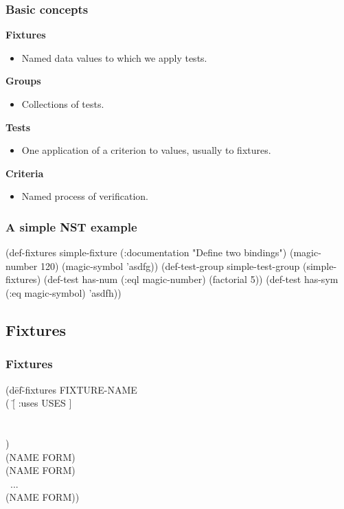 \documentclass{beamer}
\begin{document}
\begin{frame}
  \frametitle{Basic concepts}
\textbf{Fixtures}
\begin{itemize}
\item Named data values to which we apply tests.
\end{itemize}
\textbf{Groups}
\begin{itemize}
\item Collections of tests.
\end{itemize}
\textbf{Tests}
\begin{itemize}
\item One application of a criterion to values, usually to fixtures.
\end{itemize}
\textbf{Criteria}
\begin{itemize}
\item Named process of verification.
\end{itemize}
\end{frame}

\begin{frame}[fragile]
  \frametitle{A simple NST example}
{\small\begin{semiverbatim}
\alert<1>{(def-fixtures simple-fixture}
\alert<1>{    (:documentation "Define two bindings")}
\alert<1>{  (magic-number 120)}
\alert<1>{  (magic-symbol 'asdfg))}
\alert<2>{(def-test-group simple-test-group}
    (\alert<3>{simple-fixtures})
  \alert<7>{(def-test \alert<4>{has-num}}
      \alert<7>{\alert<5>{(:eql \alert<3>{magic-number})}}
    \alert<7>{\alert<6>{(factorial 5)})}
  \alert<8>{(def-test \alert<4>{has-sym}}
      \alert<8>{\alert<5>{(:eq \alert<3>{magic-symbol})}}
    \alert<8>{\alert<6>{'asdfh})}\alert<2>{)}
\end{semiverbatim}}
\end{frame}

\subsection{Fixtures}

\begin{frame}
  \frametitle{Fixtures}
{\ttfamily
\begin{tabbing}
  (d\=ef\=-fixtures FIXTURE-NAME
\\  \>  \>( \=[ :uses USES ]
\\  \>  \>  
\\  \>  \>  
\\  \>  \>   )
\\  \>(NAME FORM)
\\  \>(NAME FORM)
\\  \>~...
\\  \>(NAME FORM))
\end{tabbing}}
\end{frame}
\end{document}
